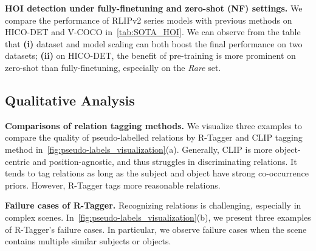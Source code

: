 \textbf{HOI detection under fully-finetuning and zero-shot (NF) settings.}
We compare the performance of RLIPv2 series models with previous methods on HICO-DET and V-COCO in~\cref{tab:SOTA_HOI}.
We can observe from the table that
\textbf{(i)} dataset and model scaling can both boost the final performance on two datasets;
\textbf{(ii)} on HICO-DET, the benefit of pre-training is more prominent on zero-shot than fully-finetuning, especially on the \textit{Rare} set.















\subsection{Qualitative Analysis}

\textbf{Comparisons of relation tagging methods.}
We visualize three examples to compare the quality of pseudo-labelled relations by R-Tagger and CLIP tagging method in~\cref{fig:pseudo-labels_visualization}(a).
Generally, CLIP is more object-centric and position-agnostic, and thus struggles in discriminating relations.
It tends to tag relations as long as the subject and object have strong co-occurrence priors.
However, R-Tagger tags more reasonable relations.

\textbf{Failure cases of R-Tagger.}
Recognizing relations is challenging, especially in complex scenes.
In~\cref{fig:pseudo-labels_visualization}(b), we present three examples of R-Tagger's failure cases.
In particular, we observe failure cases when the scene contains multiple similar subjects or objects.









%

